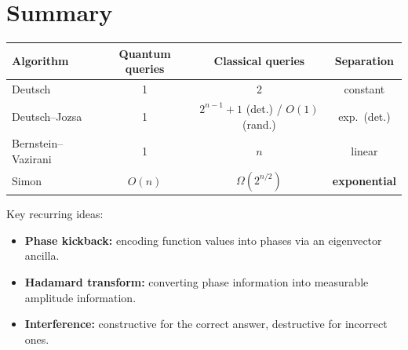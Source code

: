 \documentclass[11pt]{article}
\theoremstyle{definition}
\begin{document}
\section{Summary}

\begin{center}
\begin{tabular}{lccc}
\hline
\textbf{Algorithm} & \textbf{Quantum queries} & \textbf{Classical queries} & \textbf{Separation} \\\hline
Deutsch & 1 & 2 & constant \\
Deutsch--Jozsa & 1 & $2^{n-1}+1$ (det.) / $O(1)$ (rand.) & exp.\ (det.) \\
Bernstein--Vazirani & 1 & $n$ & linear \\
Simon & $O(n)$ & $\Omega(2^{n/2})$ & \textbf{exponential} \\
\hline
\end{tabular}
\end{center}

Key recurring ideas:
\begin{itemize}
    \item \textbf{Phase kickback:} encoding function values into phases via an eigenvector ancilla.
    \item \textbf{Hadamard transform:} converting phase information into measurable amplitude information.
    \item \textbf{Interference:} constructive for the correct answer, destructive for incorrect ones.
\end{itemize}
\end{document}
